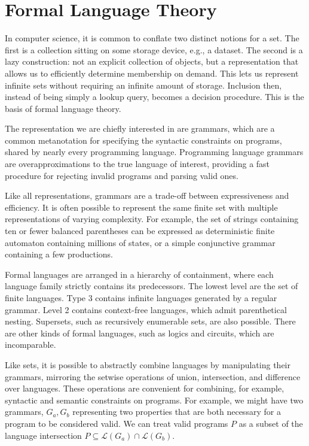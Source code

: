 \chapter{\rm\bfseries Formal Language Theory}
\label{ch:chapter01}

In computer science, it is common to conflate two distinct notions for a set. The first is a collection sitting on some storage device, e.g., a dataset. The second is a lazy construction: not an explicit collection of objects, but a representation that allows us to efficiently determine membership on demand. This lets us represent infinite sets without requiring an infinite amount of storage. Inclusion then, instead of being simply a lookup query, becomes a decision procedure. This is the basis of formal language theory.

The representation we are chiefly interested in are grammars, which are a common metanotation for specifying the syntactic constraints on programs, shared by nearly every programming language. Programming language grammars are overapproximations to the true language of interest, providing a fast procedure for rejecting invalid programs and parsing valid ones.

Like all representations, grammars are a trade-off between expressiveness and efficiency. It is often possible to represent the same finite set with multiple representations of varying complexity. For example, the set of strings containing ten or fewer balanced parentheses can be expressed as deterministic finite automaton containing millions of states, or a simple conjunctive grammar containing a few productions.

Formal languages are arranged in a hierarchy of containment, where each language family strictly contains its predecessors. The lowest level are the set of finite languages. Type 3 contains infinite languages generated by a regular grammar. Level 2 contains context-free languages, which admit parenthetical nesting. Supersets, such as recursively enumerable sets, are also possible. There are other kinds of formal languages, such as logics and circuits, which are incomparable.

Like sets, it is possible to abstractly combine languages by manipulating their grammars, mirroring the setwise operations of union, intersection, and difference over languages. These operations are convenient for combining, for example, syntactic and semantic constraints on programs. For example, we might have two grammars, $G_a, G_b$ representing two properties that are both necessary for a program to be considered valid. We can treat valid programs $P$ as a subset of the language intersection $P \subseteq \mathcal{L}(G_a) \cap \mathcal{L}(G_b)$.

\clearpage